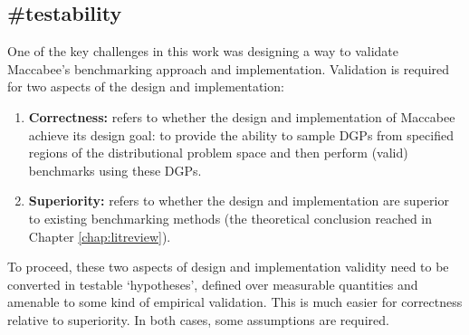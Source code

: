 \documentclass[./main.tex]{subfiles}
\begin{document}

\subsection{\textbf{\#testability}}
\label{hc:testability}

One of the key challenges in this work was designing a way to validate Maccabee's benchmarking approach and implementation. Validation is required for two aspects of the design and implementation:

\begin{enumerate}
    \item \textbf{Correctness:} refers to whether the design and implementation of Maccabee achieve its design goal: to provide the ability to sample DGPs from specified regions of the distributional problem space and then perform (valid) benchmarks using these DGPs.
    
    \item \textbf{Superiority:} refers to whether the design and implementation are superior to existing benchmarking methods (the theoretical conclusion reached in Chapter \ref{chap:litreview}).
\end{enumerate}

To proceed, these two aspects of design and implementation validity need to be converted in testable `hypotheses', defined over measurable quantities and amenable to some kind of empirical validation. This is much easier for correctness relative to superiority. In both cases, some assumptions are required.
\end{document}
